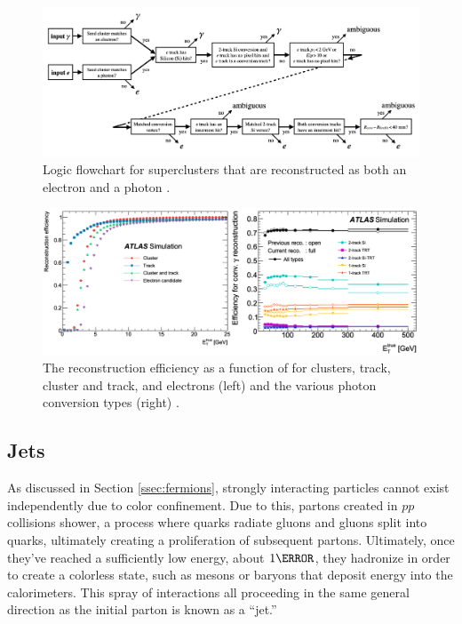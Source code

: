 \begin{figure}[h]
    \centering
    \includegraphics[width=1\textwidth]{chapters/chapter3_eventreco/images/egamma-amb.png}

    \caption[Logic flowchart for superclusters that are reconstructed as both an electron and a photon]{Logic flowchart for superclusters that are reconstructed as both an electron and a photon \cite{photon-electron-perf}.}
    \label{fig:ambiguity-logic}
\end{figure}



\begin{figure}[h]
    \centering
    \includegraphics[width=1\textwidth]{chapters/chapter3_eventreco/images/combined-efficiency.png}

    \caption[The reconstruction efficiency as a function of \et for electrons and converted photons]{The reconstruction efficiency as a function of \et for clusters, track, cluster and track, and electrons (left) and the various photon conversion types (right) \cite{photon-electron-perf}.}
    \label{fig:reco-eff}
\end{figure}


\subsection{Jets} \label{ssec:jet-reco}
As discussed in Section \ref{ssec:fermions}, strongly interacting particles cannot exist independently due to color confinement. Due to this, partons created in $pp$ collisions shower, a process where quarks radiate gluons and gluons split into quarks, ultimately creating a proliferation of subsequent partons. Ultimately, once they've reached a sufficiently low energy, about $\unit{1}{\GeV}$, they hadronize in order to create a colorless state, such as mesons or baryons that deposit energy into the calorimeters. This spray of interactions all proceeding in the same general direction as the initial parton is known as a ``jet.''

